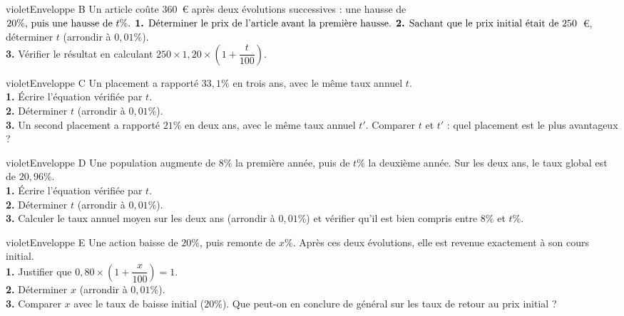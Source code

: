\documentclass[12pt,a4paper]{article}
\begin{document}
\newpage

\begin{carte}{violet}{Enveloppe B}
Un article coûte \(360\)~\euro{} après deux évolutions successives : une hausse de \(20\%$, puis une hausse de $t\%$.\\[0.3cm]
\textbf{1.} Déterminer le prix de l'article avant la première hausse.\\[0.1cm]
\textbf{2.} Sachant que le prix initial était de \(250\)~\euro{}, déterminer \(t\) (arrondir à \(0{,}01\%\)).\\[0.1cm]
\textbf{3.} Vérifier le résultat en calculant \(250 \times 1{,}20 \times \left(1+\dfrac{t}{100}\right)\).
\end{carte}

\newpage

\begin{carte}{violet}{Enveloppe C}
Un placement a rapporté \(33{,}1\%\) en trois ans, avec le même taux annuel \(t\).\\[0.3cm]
\textbf{1.} Écrire l'équation vérifiée par \(t\).\\[0.1cm]
\textbf{2.} Déterminer \(t\) (arrondir à \(0{,}01\%\)).\\[0.1cm]
\textbf{3.} Un second placement a rapporté \(21\%\) en deux ans, avec le même taux annuel \(t'\). Comparer \(t\) et \(t'\) : quel placement est le plus avantageux ?
\end{carte}

\newpage

\begin{carte}{violet}{Enveloppe D}
Une population augmente de \(8\%\) la première année, puis de \(t\%\) la deuxième année. Sur les deux ans, le taux global est de \(20{,}96\%\).\\[0.3cm]
\textbf{1.} Écrire l'équation vérifiée par \(t\).\\[0.1cm]
\textbf{2.} Déterminer \(t\) (arrondir à \(0{,}01\%\)).\\[0.1cm]
\textbf{3.} Calculer le taux annuel moyen sur les deux ans (arrondir à \(0{,}01\%\)) et vérifier qu'il est bien compris entre \(8\%\) et \(t\%\).
\end{carte}

\newpage

\begin{carte}{violet}{Enveloppe E}
Une action baisse de \(20\%\), puis remonte de \(x\%\). Après ces deux évolutions, elle est revenue exactement à son cours initial.\\[0.3cm]
\textbf{1.} Justifier que \(0{,}80 \times \left(1+\dfrac{x}{100}\right) = 1\).\\[0.1cm]
\textbf{2.} Déterminer \(x\) (arrondir à \(0{,}01\%\)).\\[0.1cm]
\textbf{3.} Comparer \(x\) avec le taux de baisse initial (\(20\%\)). Que peut-on en conclure de général sur les taux de retour au prix initial ?
\end{carte}
\end{document}
